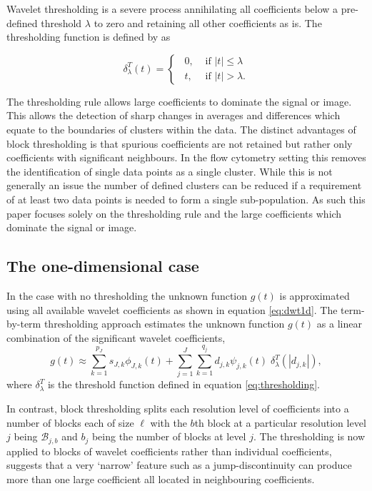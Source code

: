 \documentclass[a4paper, 12pt]{article}
\begin{document}
\medskip
Wavelet thresholding is a severe process annihilating all coefficients below a pre-defined threshold $\lambda$ to zero and retaining all other coefficients as is. The thresholding function is defined by \cite{donohojohnstone1994} as 

\begin{equation}
\delta^{T}_{\lambda}(t) = 
  \begin{cases}
      \phantom{0}0, & \text{ if }|t| \leq \lambda \\
      \phantom{0}t, & \text{ if }|t| > \lambda.
  \end{cases}
\label{eq:thresholding}
\end{equation}

The thresholding rule allows large coefficients to dominate the signal or image. This allows the detection of sharp changes in averages and differences which equate to the boundaries of clusters within the data. The distinct advantages of block thresholding is that spurious coefficients are not retained but rather only coefficients with significant neighbours. In the flow cytometry setting this removes the identification of single data points as a single cluster. While this is not generally an issue the number of defined clusters can be reduced if a requirement of at least two data points is needed to form a single sub-population. As such this paper focuses solely on the thresholding rule and the large coefficients which dominate the signal or image.

\subsection{The one-dimensional case}
In the case with no thresholding the unknown function $g(t)$ is approximated using all available wavelet coefficients as shown in equation \ref{eq:dwt1d}. The term-by-term thresholding approach estimates the unknown function $g(t)$ as a linear combination of the significant wavelet coefficients,
\begin{equation}
g(t) \approx \sum_{k=1}^{p_{J}} s_{J,k} \phi_{J,k}(t) + \sum_{j=1}^J\sum_{k=1}^{q_{j}} d_{j,k}\psi_{j,k}(t) \; \delta^{T}_{\lambda}(|d_{j,k}|),
\label{eq:termbyterm1d}
\end{equation}
where $\delta^{T}_{\lambda}$ is the threshold function defined in equation \ref{eq:thresholding}.

\medskip
In contrast, block thresholding splits each resolution level of coefficients into a number of blocks each of size $\ell$ with the $b$th block at a particular resolution level $j$ being $\mathcal{B}_{j, b}$ and $b_{j}$ being the number of blocks at level $j$. The thresholding is now applied to blocks of wavelet coefficients rather than individual coefficients, \cite{nason} suggests that a very `narrow' feature such as a jump-discontinuity can produce more than one large coefficient all located in neighbouring coefficients.
\end{document}
